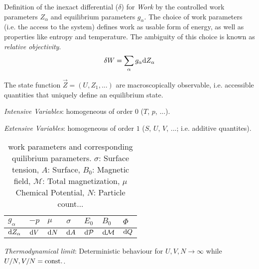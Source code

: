 			Definition of the inexact differential ($\delta$) for \emph{Work} by the controlled work parameters $Z_\alpha$ and equilibrium parameters $g_\alpha$.
			The choice of work parameters (i.e. the access to the system) defines work as usable form of energy, as well as properties like entropy and temperature. The ambiguity of this choice is known as \emph{relative objectivity}.
			\begin{equation}
				\delta W = \sum_\alpha g_\alpha \mathrm{d} Z_\alpha
			\end{equation} \vsp

			The state function $\vec{Z}=\left(U, Z_1,... \right)$ are macroscopically observable, i.e. accessible quantities that uniquely define an equilibrium state. \vsp

			\emph{Intensive Variables}: homogeneous of order $0$ ($T$, $p$, ...). \vsp

			\emph{Extensive Variables}: homogeneous of order $1$ ($S$, $U$, $V$, ...; i.e. additive quantites). \vsp

			\begin{table}[ht]
				\begin{center}
				\begin{tabular}{ l | l l l l l l }
					$g_\alpha$ & $-p$ & $\mu$ & $\sigma$ & $E_0$ & $B_0$ & $\Phi$ \\ \hline
					$\mathrm{d} Z_\alpha$ & $\mathrm{d} V$ & $\mathrm{d} N$ & $\mathrm{d} A$ & $\mathrm{d} \mathcal{P}$ & $\mathrm{d} \mathcal{M}$ & $\mathrm{d} Q$ \\
					\end{tabular}
				\caption{work parameters and corresponding quilibrium parameters. $\sigma$: Surface tension, $A$: Surface, $B_0$: Magnetic field, $\mathcal{M}$: Total magnetization, $\mu$ Chemical Potential, $N$: Particle count...}
				\label{tab:WorkParametersAndEquilibriumParameters}
				\end{center}
			\end{table} \vsp

			\noindent
			\emph{Thermodynamical limit}: \newline Deterministic behaviour for $U,V,N\rightarrow\infty$ while $U/N,V/N=\mathrm{const.}$. \vsp


